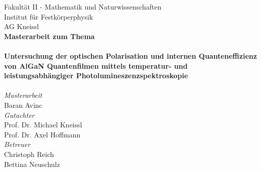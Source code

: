 
\begin{titlepage}
		\pagestyle{fancy}
		\centering Fakultät II - Mathematik und Naturwissenschaften \\
		\centering Institut für Festkörperphysik \\
		\centering AG Kneissl \\
		\vspace{0.5cm}
		\centering\textbf{\large Masterarbeit zum Thema}\\
		\vspace{1cm} 
		\noindent{\color{RoyalPurple}\rule{\textwidth}{1pt}} \\
		\vspace{0.5cm} 
		\centering\textbf{\large Untersuchung der optischen Polarisation und internen Quanteneffizienz von AlGaN Quantenfilmen mittels temperatur- und leistungsabhängiger Photolumineszenzspektroskopie} \\
		\vspace{0.25cm} 
		\noindent{\color{RoyalPurple}\rule{\textwidth}{1pt}} \\
		\vspace{1cm}
		\centering \emph{ \large{Masterarbeit}} \\
		\centering Baran Avinc \\
		\vspace{1cm}
		\centering \emph{ \large{Gutachter}} \\
		\centering Prof. Dr. Michael Kneissl \\
		\centering Prof. Dr. Axel Hoffmann  \\
		\vspace{0.5cm} 
		\centering \emph{ \large{Betreuer}} \\
		\centering Christoph Reich \\
		\centering Bettina Neuschulz \\
		\vspace{1cm}
\end{titlepage}


